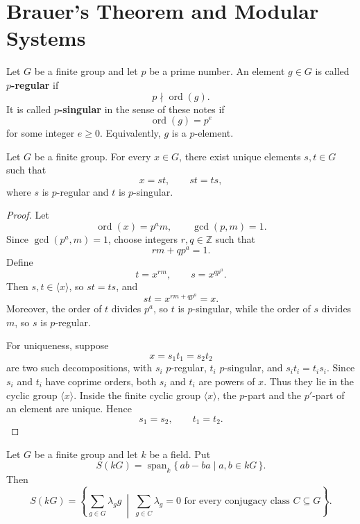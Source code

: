 \section{Brauer's Theorem and Modular Systems}

\begin{definition}
    Let \(G\) be a finite group and let \(p\) be a prime number.
    An element \(g\in G\) is called \textbf{\(p\)-regular} if
    \[
        p\nmid \operatorname{ord}(g).
    \]
    It is called \textbf{\(p\)-singular} in the sense of these notes if
    \[
        \operatorname{ord}(g)=p^e
    \]
    for some integer \(e\geq 0\). Equivalently, \(g\) is a \(p\)-element.
\end{definition}

\begin{lemma}
    Let \(G\) be a finite group. For every \(x\in G\), there exist unique elements
    \(s,t\in G\) such that
    \[
        x=st,
        \qquad
        st=ts,
    \]
    where \(s\) is \(p\)-regular and \(t\) is \(p\)-singular.
\end{lemma}

\begin{proof}
    Let
    \[
        \operatorname{ord}(x)=p^a m,
        \qquad
        \gcd(p,m)=1.
    \]
    Since \(\gcd(p^a,m)=1\), choose integers \(r,q\in \mathbb Z\) such that
    \[
        rm+qp^a=1.
    \]
    Define
    \[
        t=x^{rm},
        \qquad
        s=x^{qp^a}.
    \]
    Then \(s,t\in \langle x\rangle\), so \(st=ts\), and
    \[
        st=x^{rm+qp^a}=x.
    \]
    Moreover, the order of \(t\) divides \(p^a\), so \(t\) is \(p\)-singular, while the
    order of \(s\) divides \(m\), so \(s\) is \(p\)-regular.

    For uniqueness, suppose
    \[
        x=s_1t_1=s_2t_2
    \]
    are two such decompositions, with \(s_i\) \(p\)-regular, \(t_i\) \(p\)-singular, and
    \(s_it_i=t_is_i\). Since \(s_i\) and \(t_i\) have coprime orders, both \(s_i\) and
    \(t_i\) are powers of \(x\). Thus they lie in the cyclic group \(\langle x\rangle\).
    Inside the finite cyclic group \(\langle x\rangle\), the \(p\)-part and the \(p'\)-part
    of an element are unique. Hence
    \[
        s_1=s_2,
        \qquad
        t_1=t_2.
    \]
\end{proof}

\begin{lemma}
    Let \(G\) be a finite group and let \(k\) be a field. Put
    \[
        S(kG)=\operatorname{span}_k\{\,ab-ba\mid a,b\in kG\,\}.
    \]
    Then
    \[
        S(kG)
        =
        \left\{
            \sum_{g\in G}\lambda_g g
            \ \middle|\
            \sum_{g\in C}\lambda_g=0
            \text{ for every conjugacy class } C\subseteq G
        \right\}.
    \]
\end{lemma}

